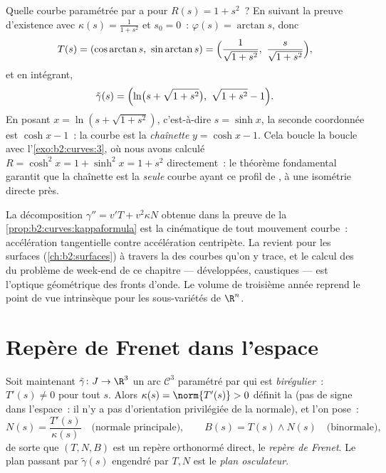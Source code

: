 \begin{example}\label{ex:b2:curves:reconstruction}
Quelle courbe paramétrée par  a pour  $R(s) = 1 +
s^2$~? En suivant la preuve d'existence avec $\kappa(s) =
\frac1{1+s^2}$ et $s_0 = 0$~: $\varphi(s) = \arctan s$, donc
\[
T(s) = (\cos\arctan s,\ \sin\arctan s)
= \Bigl(\frac{1}{\sqrt{1+s^2}},\
\frac{s}{\sqrt{1+s^2}}\Bigr),
\]
et en intégrant,
\[
\tilde\gamma(s) = \Bigl(\ln\bigl(s + \sqrt{1 + s^2}\bigr),\
\sqrt{1 + s^2} - 1\Bigr).
\]
En posant $x = \ln(s + \sqrt{1+s^2})$, c'est-à-dire $s = \sinh x$, la
seconde coordonnée est $\cosh x - 1$~: la courbe est la
\emph{chaînette} $y = \cosh x - 1$. Cela boucle la boucle avec
l'\cref{exo:b2:curves:3}, où nous avons calculé $R = \cosh^2 x = 1 +
\sinh^2 x = 1 + s^2$ directement~: le théorème fondamental
garantit que la chaînette est la \emph{seule} courbe ayant ce
profil de \omterm{thm:b2:curves:frenet2d}{courbure}, à une isométrie directe près.
\end{example}

\begin{remark}
La décomposition $\gamma'' = v'T + v^2\kappa N$ obtenue dans
la preuve de la \cref{prop:b2:curves:kappaformula} est la
cinématique de tout mouvement courbe~: accélération tangentielle
contre accélération centripète. La  revient pour les
surfaces
(\cref{ch:b2:surfaces}) à travers la \omterm{thm:b2:curves:frenet2d}{courbure} des courbes qu'on
y trace, et le calcul des  du problème de week-end de
ce chapitre --- développées, caustiques --- est l'optique
géométrique des fronts d'onde. Le volume de troisième année
reprend le point de vue intrinsèque pour les sous-variétés de
$\R^n$.
\end{remark}

\section{Repère de Frenet dans l'espace}

Soit maintenant $\tilde\gamma \colon J \to \R^3$ un arc
$\mathcal{C}^3$ paramétré par  qui est
\emph{birégulier}~: $T'(s) \neq 0$ pour
tout $s$. Alors $\kappa(s) = \norm{T'(s)} > 0$ définit la
\emph{} (pas de signe dans l'espace~: il n'y a pas
d'orientation privilégiée de la normale), et l'on pose~:
\[
N(s) = \frac{T'(s)}{\kappa(s)}
\quad\text{(normale principale)},
\qquad
B(s) = T(s) \wedge N(s)
\quad\text{(binormale)} ,
\]
de sorte que $(T, N, B)$ est un repère orthonormé direct, le
\emph{repère de Frenet}. Le plan passant par $\tilde\gamma(s)$
engendré par $T, N$ est le \emph{plan osculateur}.

